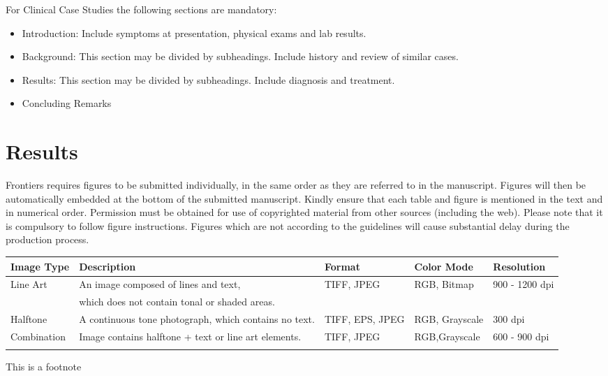 \documentclass{frontiersSCNS} %
\begin{document}
For Clinical Case Studies the following sections are mandatory:

\begin{itemize}
\item Introduction: Include symptoms at presentation, physical exams and lab results.
\item Background: This section may be divided by subheadings. Include history and review of similar cases.
\item Results: This section may be divided by subheadings. Include diagnosis and treatment.
\item Concluding Remarks
\end{itemize}




\section{Results}

Frontiers requires figures to be submitted individually, in the same order as they are referred to in the manuscript. Figures will then be automatically embedded at the bottom of the submitted manuscript. Kindly ensure that each table and figure is mentioned in the text and in numerical order. Permission must be obtained for use of copyrighted material from other sources (including the web). Please note that it is compulsory to follow figure instructions. Figures which are not according to the guidelines will cause substantial delay during the production process.

\begin{table}[!t]
{\begin{tabular}{lllll}\toprule
Image Type & Description & Format & Color Mode & Resolution\\\midrule
Line Art & An image composed of lines and text,  & TIFF, JPEG & RGB, Bitmap & 900 - 1200 dpi\\
           & which does not contain tonal or shaded areas.& & &\\
           Halftone & A continuous tone photograph, which contains no text. & TIFF, EPS, JPEG & RGB, Grayscale & 300 dpi\\
Combination & Image contains halftone + text or line art elements. & TIFF, JPEG & RGB,Grayscale & 600 - 900 dpi\\\botrule
\end{tabular}}{This is a footnote}
\end{table}
\end{document}
